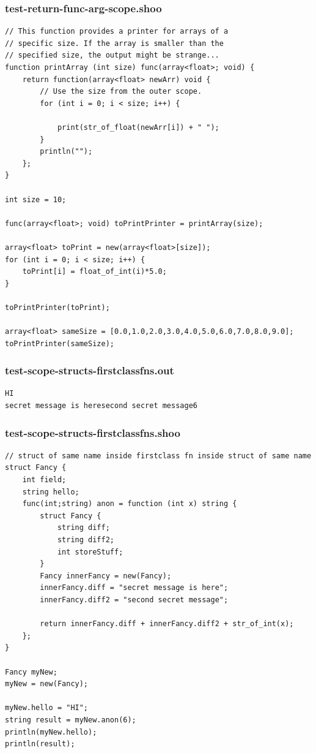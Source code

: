 \documentclass[12pt]{article}
\begin{document}
\subsubsection{test-return-func-arg-scope.shoo}
\begin{mdframed}[hidealllines=true,backgroundcolor=blue!10]
\begin{lstlisting}
// This function provides a printer for arrays of a
// specific size. If the array is smaller than the 
// specified size, the output might be strange... 
function printArray (int size) func(array<float>; void) {
    return function(array<float> newArr) void {
        // Use the size from the outer scope.
        for (int i = 0; i < size; i++) {
            
            print(str_of_float(newArr[i]) + " ");
        }
        println("");
    };
}

int size = 10;

func(array<float>; void) toPrintPrinter = printArray(size);

array<float> toPrint = new(array<float>[size]);
for (int i = 0; i < size; i++) {
    toPrint[i] = float_of_int(i)*5.0;
}

toPrintPrinter(toPrint);

array<float> sameSize = [0.0,1.0,2.0,3.0,4.0,5.0,6.0,7.0,8.0,9.0];
toPrintPrinter(sameSize);
\end{lstlisting}
\end{mdframed}
\subsubsection{test-scope-structs-firstclassfns.out}
\begin{mdframed}[hidealllines=true,backgroundcolor=green!10]
\begin{lstlisting}
HI
secret message is heresecond secret message6\end{lstlisting}
\end{mdframed}
\subsubsection{test-scope-structs-firstclassfns.shoo}
\begin{mdframed}[hidealllines=true,backgroundcolor=blue!10]
\begin{lstlisting}
// struct of same name inside firstclass fn inside struct of same name
struct Fancy {
	int field;
	string hello;
	func(int;string) anon = function (int x) string {
		struct Fancy {
			string diff;
			string diff2;
			int storeStuff;
		}
		Fancy innerFancy = new(Fancy);
		innerFancy.diff = "secret message is here";
		innerFancy.diff2 = "second secret message";

		return innerFancy.diff + innerFancy.diff2 + str_of_int(x);
	};
}

Fancy myNew;
myNew = new(Fancy);

myNew.hello = "HI";
string result = myNew.anon(6);
println(myNew.hello);
println(result);\end{lstlisting}
\end{mdframed}
\end{document}
